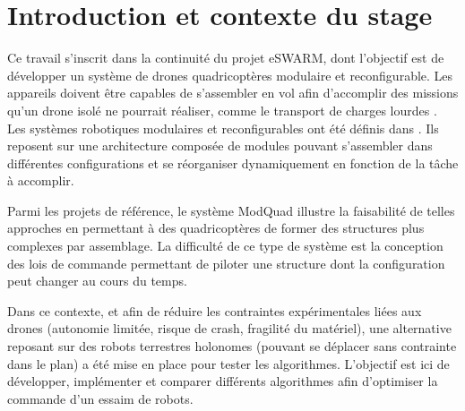 \section{Introduction et contexte du stage}

Ce travail s’inscrit dans la continuité du projet eSWARM, dont l’objectif est de développer un système de drones quadricoptères modulaire et reconfigurable. Les appareils doivent être capables de s’assembler en vol afin d’accomplir des missions qu’un drone isolé ne pourrait réaliser, comme le transport de charges lourdes \cite{bonnel_modeling_2024}. Les systèmes robotiques modulaires et reconfigurables ont été définis dans \cite{seo_modular_2019, brooks_overview_2021}. Ils reposent sur une architecture composée de modules pouvant s’assembler dans différentes configurations et se réorganiser dynamiquement en fonction de la tâche à accomplir.

Parmi les projets de référence, le système ModQuad \cite{saldana_modquad_2018} illustre la faisabilité de telles approches en permettant à des quadricoptères de former des structures plus complexes par assemblage. La difficulté de ce type de système est la conception des lois de commande permettant de piloter une structure dont la configuration peut changer au cours du temps.

Dans ce contexte, et afin de réduire les contraintes expérimentales liées aux drones (autonomie limitée, risque de crash, fragilité du matériel), une alternative reposant sur des robots terrestres holonomes (pouvant se déplacer sans contrainte dans le plan) a été mise en place pour tester les algorithmes. L’objectif est ici de développer, implémenter et comparer différents algorithmes afin d'optimiser la commande d'un essaim de robots.
